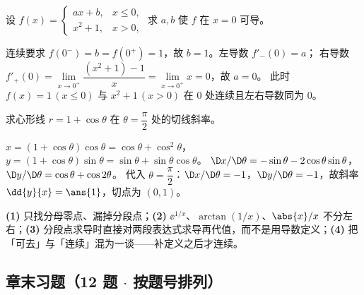 \documentclass[11pt,a4paper]{ctexart}
\begin{document}
\begin{exa}[分段点连续且可导求参数]
设 $f(x)=\begin{cases}ax+b,&x\le0,\\ x^2+1,&x>0,\end{cases}$ 求 $a,b$ 使 $f$ 在 $x=0$ 可导。
\end{exa}
\begin{solution}
连续要求 $f(0^-)=b=f(0^+)=1$，故 $b=1$。左导数 $f'_-(0)=a$；
右导数 $f'_+(0)=\lim\limits_{x\to0^+}\dfrac{(x^2+1)-1}{x}=\lim\limits_{x\to0^+}x=0$，故 $a=0$。
此时 $f(x)=1\,(x\le0)$ 与 $x^2+1\,(x>0)$ 在 $0$ 处连续且左右导数同为 $0$。
\end{solution}

\begin{exa}[极坐标切线]
求心形线 $r=1+\cos\theta$ 在 $\theta=\dfrac\pi2$ 处的切线斜率。
\end{exa}
\begin{solution}
$x=(1+\cos\theta)\cos\theta=\cos\theta+\cos^2\theta$，
$y=(1+\cos\theta)\sin\theta=\sin\theta+\sin\theta\cos\theta$。
$\D x/\D\theta=-\sin\theta-2\cos\theta\sin\theta$，$\D y/\D\theta=\cos\theta+\cos2\theta$。
代入 $\theta=\dfrac\pi2$：$\D x/\D\theta=-1$，$\D y/\D\theta=-1$，故斜率 $\dd{y}{x}=\ans{1}$，切点为 $(0,1)$。
\end{solution}

\begin{warnbox}[本类题的判卷点]
\textbf{(1)} 只找分母零点、漏掉分段点；\textbf{(2)} $\ee^{1/x}$、$\arctan(1/x)$、$\abs{x}/x$ 不分左右；\textbf{(3)} 分段点求导时直接对两段表达式求导再代值，而不是用导数定义；\textbf{(4)} 把「可去」与「连续」混为一谈——补定义之后才连续。
\end{warnbox}
\subsection{章末习题（12 题 \texorpdfstring{$\cdot$}{·} 按题号排列）}
\end{document}
